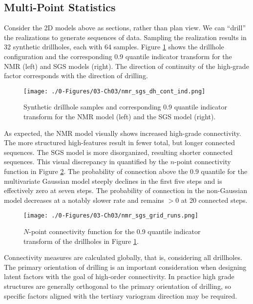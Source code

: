 \FloatBarrier
\subsection{Multi-Point Statistics}
\label{subsec:03multipt}

Consider the \gls{2D} models above as sections, rather than plan view. We can ``drill'' the realizations to generate sequences of data. Sampling the realization results in 32 synthetic drillholes, each with 64 samples. Figure \ref{fig:nmr_sgs_dh_cont_ind} shows the drillhole configuration and the corresponding 0.9 quantile indicator transform for the \gls{NMR} (left) and \gls{SGS} models (right). The direction of continuity of the high-grade factor corresponds with the direction of drilling.

\begin{figure}[htb!]
    \centering
    \texttt{[image: ./0-Figures/03-Ch03/nmr\_sgs\_dh\_cont\_ind.png]}
    \caption{ Synthetic drillhole samples and corresponding 0.9 quantile indicator transform for the \gls{NMR} model (left) and the \gls{SGS} model (right).}
    \label{fig:nmr_sgs_dh_cont_ind}
\end{figure}

As expected, the \gls{NMR} model visually shows increased high-grade connectivity. The more structured high-features result in fewer total, but longer connected sequences. The \gls{SGS} model is more disorganized, resulting shorter connected sequences. This visual discrepancy in quantified by the $n$-point connectivity function in Figure \ref{fig:nmr_sgs_grid_runs}. The probability of connection above the 0.9 quantile for the multivariate Gaussian model steeply declines in the first five steps and is effectively zero at seven steps. The probability of connection in the non-Gaussian model decreases at a notably slower rate and remains $> 0$ at 20 connected steps.

\begin{figure}[htb!]
    \centering
    \texttt{[image: ./0-Figures/03-Ch03/nmr\_sgs\_grid\_runs.png]}
    \caption{ $N$-point connectivity function for the 0.9 quantile indicator transform of the drillholes in Figure \ref{fig:nmr_sgs_dh_cont_ind}.}
    \label{fig:nmr_sgs_grid_runs}
\end{figure}

Connectivity measures are calculated globally, that is, considering all drillholes. The primary orientation of drilling is an important consideration when designing latent factors with the goal of high-order connectivity. In practice high grade structures are generally orthogonal to the primary orientation of drilling, so specific factors aligned with the tertiary variogram direction may be required.


